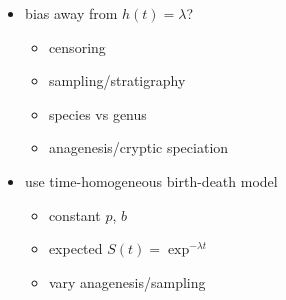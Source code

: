 \documentclass{beamer}
\begin{document}
\begin{frame}
\begin{columns}
\begin{column}{0.5\textwidth}
\begin{center}
        \tiny{}
      \end{center}
    \end{column}
    \begin{column}{0.5\textwidth}
      \begin{itemize}
        \item bias away from \(h(t) = \lambda\)?
          \begin{itemize}
            \item censoring
            \item sampling/stratigraphy
            \item species vs genus
            \item anagenesis/cryptic speciation
          \end{itemize}
        \item use time-homogeneous birth-death model
          \begin{itemize}
            \item constant \(p\), \(b\)
            \item expected \(S(t) = \exp^{-\lambda t}\)
            \item vary anagenesis/sampling
          \end{itemize}
      \end{itemize}
    \end{column}
  \end{columns}
\end{frame}
\end{document}
